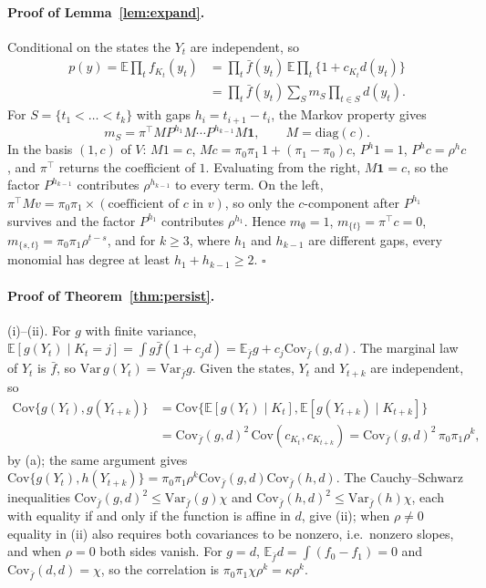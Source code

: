 \documentclass[12pt,letterpaper]{article}
\newcommand{\E}{\mathbb{E}}
\theoremstyle{plain}
\theoremstyle{remark}
\begin{document}
\paragraph{Proof of Lemma~\ref{lem:expand}.} Conditional on the states the $Y_t$ are independent, so
\begin{align*}p(y)=\E\prod_tf_{K_t}(y_t)&=\prod_t\bar f(y_t)\,\E\prod_t\{1+c_{K_t}d(y_t)\}\\&=\prod_t\bar f(y_t)\sum_{S}m_S\prod_{t\in S}d(y_t).\end{align*}
For $S=\{t_1<\dots<t_k\}$ with gaps $h_i=t_{i+1}-t_i$, the Markov property gives \[m_S=\pi^\top MP^{h_1}M\cdots P^{h_{k-1}}M\mathbf 1,\qquad M=\mathrm{diag}(c).\] In the basis $(1,c)$ of $V$: $M1=c$, $Mc=\pi_0\pi_1\,1+(\pi_1-\pi_0)c$, $P^h1=1$, $P^hc=\rho^hc$, and $\pi^\top$ returns the coefficient of $1$. Evaluating from the right, $M\mathbf 1=c$, so the factor $P^{h_{k-1}}$ contributes $\rho^{h_{k-1}}$ to every term. On the left, $\pi^\top Mv=\pi_0\pi_1\times(\text{coefficient of }c\text{ in }v)$, so only the $c$-component after $P^{h_1}$ survives and the factor $P^{h_1}$ contributes $\rho^{h_1}$. Hence $m_\emptyset=1$, $m_{\{t\}}=\pi^\top c=0$, $m_{\{s,t\}}=\pi_0\pi_1\rho^{t-s}$, and for $k\ge3$, where $h_1$ and $h_{k-1}$ are different gaps, every monomial has degree at least $h_1+h_{k-1}\ge2$. $\square$

\paragraph{Proof of Theorem~\ref{thm:persist}.} (i)--(ii). For $g$ with finite variance, $\E[g(Y_t)\mid K_t=j]=\int g\bar f(1+c_jd)=\E_{\bar f}g+c_j\mathrm{Cov}_{\bar f}(g,d)$. The marginal law of $Y_t$ is $\bar f$, so $\mathrm{Var}\,g(Y_t)=\mathrm{Var}_{\bar f}g$. Given the states, $Y_t$ and $Y_{t+k}$ are independent, so
\begin{align*}\mathrm{Cov}\{g(Y_t),g(Y_{t+k})\}&=\mathrm{Cov}\{\E[g(Y_t)\mid K_t],\E[g(Y_{t+k})\mid K_{t+k}]\}\\&=\mathrm{Cov}_{\bar f}(g,d)^2\,\mathrm{Cov}(c_{K_t},c_{K_{t+k}})=\mathrm{Cov}_{\bar f}(g,d)^2\,\pi_0\pi_1\rho^k,\end{align*}
by (a); the same argument gives $\mathrm{Cov}\{g(Y_t),h(Y_{t+k})\}=\pi_0\pi_1\rho^k\mathrm{Cov}_{\bar f}(g,d)\mathrm{Cov}_{\bar f}(h,d)$. The Cauchy--Schwarz inequalities $\mathrm{Cov}_{\bar f}(g,d)^2\le\mathrm{Var}_{\bar f}(g)\chi$ and $\mathrm{Cov}_{\bar f}(h,d)^2\le\mathrm{Var}_{\bar f}(h)\chi$, each with equality if and only if the function is affine in $d$, give (ii); when $\rho\neq0$ equality in (ii) also requires both covariances to be nonzero, i.e.\ nonzero slopes, and when $\rho=0$ both sides vanish. For $g=d$, $\E_{\bar f}d=\int(f_0-f_1)=0$ and $\mathrm{Cov}_{\bar f}(d,d)=\chi$, so the correlation is $\pi_0\pi_1\chi\rho^k=\kappa\rho^k$.
\end{document}
